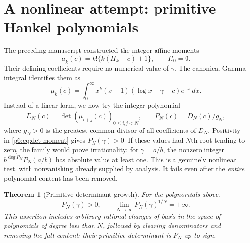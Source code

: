 \documentclass[11pt,a4paper]{article}
\newtheorem{theorem}{Theorem}[section]
\theoremstyle{definition}
\theoremstyle{remark}
\numberwithin{equation}{section}
\begin{document}
\section{A nonlinear attempt: primitive Hankel polynomials}
\label{p6:sec:determinant}

The preceding manuscript constructed the integer affine moments
\[
 \mu_k(c)=k!\{k(H_k-c)+1\},\qquad H_0=0.
\]
Their defining coefficients require no numerical value of $\gamma$.
The canonical Gamma integral identifies them as
\begin{equation}\label{p6:eq:det-moment}
 \mu_k(c)=\int_0^\infty x^k(x-1)(\log x+\gamma-c)e^{-x}\,dx.
\end{equation}
Instead of a linear form, we now try the integer polynomial
\[
 D_N(c)=\det(\mu_{i+j}(c))_{0\leq i,j<N},\qquad
 P_N(c)=D_N(c)/g_N,
\]
where $g_N>0$ is the greatest common divisor of all coefficients of
$D_N$.  Positivity in \eqref{p6:eq:det-moment} gives $P_N(\gamma)>0$.
If these values had $N$th root tending to zero, the family would prove
irrationality: for $\gamma=a/b$, the nonzero integer
$b^{\deg P_N}P_N(a/b)$ has absolute value at least one.
This is a genuinely nonlinear test, with nonvanishing already supplied
by analysis.  It fails even after the \emph{entire} polynomial content
has been removed.

\begin{theorem}[Primitive determinant growth]\label{p6:thm:det-growth}
For the polynomials above,
\[
 P_N(\gamma)>0,\qquad
 \lim_{N\to\infty}P_N(\gamma)^{1/N}=+\infty.
\]
This assertion includes arbitrary rational changes of basis in the
space of polynomials of degree less than $N$, followed by clearing
denominators and removing the full content: their primitive
determinant is $P_N$ up to sign.
\end{theorem}
\end{document}
